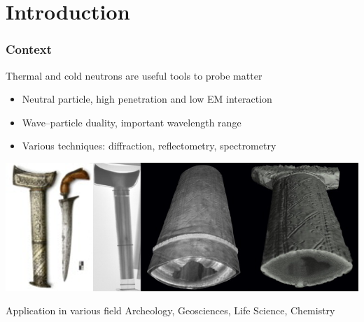 
\section{Introduction}
\begin{frame}
  \frametitle{Context}
  Thermal and cold neutrons are useful tools to probe matter
    \begin{itemize}
      \item Neutral particle, high penetration and low EM interaction
      \item Wave–particle duality, important wavelength range
      \item Various techniques: diffraction, reflectometry, spectrometry
    \end{itemize}
  \includegraphics[width=\textwidth]{01_Neutron/fig/fig000_Dague.png}
  \begin{block}{Application in various field}
    Archeology, Geosciences, Life Science, Chemistry
  \end{block}
\end{frame}

